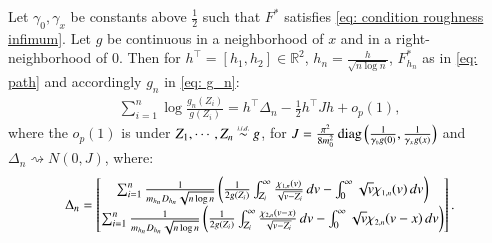 \begin{theorem}\label{thm: LAN}
Let $\gamma_0, \gamma_x$ be constants above $\frac{1}{2}$ such that $F^*$ satisfies \eqref{eq: condition roughness infimum}. Let $g$ be continuous in a neighborhood of $x$ and in a right-neighborhood of $0$. Then for $h^{\top} = [h_1,h_2] \in \mathbb{R}^2$, $h_n = \frac{h}{\sqrt{n\log{n}}}$, $F^*_{h_n}$ as in \eqref{eq: path} and accordingly $g_n$ in \eqref{eq: g_n}:
\begin{align*}
    \sum_{i=1}^{n} \log{\frac{g_n (Z_i)}{g(Z_i)}} = h^{\top} \Delta_n - \frac{1}{2} h^{\top} J h + o_p (1),
\end{align*}
where the $o_p(1)$ is under $Z_1,\cdots,Z_n \stackrel{\scaleto{i.i.d.}{3.2pt}}{\sim} g$, for $J =  \frac{\pi^2 }{8 m^2_0 } \operatorname{diag}\left(\frac{1}{\gamma_{\scaleto{0}{2.5pt}} g(0)}, \frac{1}{ \gamma_{\scaleto{x}{2.2pt}} g(x)}\right)$ and $\Delta_n \rightsquigarrow N\left( 0, J \right)$, where:
\begin{align*}
    \Delta_n = \begin{bmatrix} \sum_{i=1}^n \frac{1}{ m_{h_n} D_{h_n} \sqrt{n\log{n}} } \left( \frac{1}{2g(Z_i)} \int_{Z_i}^{\infty} \frac{\chi_{{\scaleto{1,n}{3.5pt}}}(v)}{\sqrt{v-Z_i}} \, dv - \int_{0}^{\infty} \sqrt{v} \chi_{{\scaleto{1,n}{4.5pt}}}(v) \, dv \right)\\ \sum_{i=1}^n \frac{1}{ m_{h_n} D_{h_n} \sqrt{n\log{n}}} \left( \frac{1}{2g(Z_i)} \int_{Z_i}^{\infty} \frac{\chi_{{\scaleto{2,n}{3.5pt}}} (v-x)}{\sqrt{v-Z_i}} \, dv - \int_{0}^{\infty} \sqrt{v} \chi_{{\scaleto{2,n}{4.5pt}}}(v - x) \, dv \right) \end{bmatrix}.
\end{align*}
\end{theorem}
